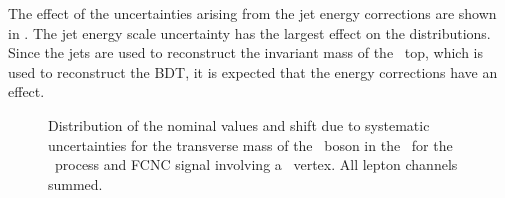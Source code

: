The effect of the uncertainties arising from the jet energy corrections are shown in . The jet energy scale uncertainty has the largest effect on the distributions. Since the jets are used to reconstruct the invariant mass of the \SM\ top, which is used to reconstruct the BDT, it is expected that the energy corrections have an effect. 
\begin{figure}[htbp] 
\centering 
	\caption{Distribution of the nominal values and shift due to systematic uncertainties for the transverse mass of the \PW\ boson in the \STSR\ for the \WZ\ process and FCNC signal involving a \Zut\ vertex. All lepton channels summed.}
\label{fig:shiftBDTSTZut122}
\end{figure}

